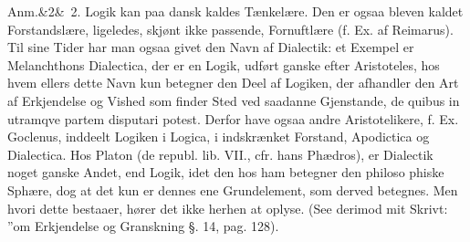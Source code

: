 \documentclass[12pt]{book}
\def\sperr#1{#1}%
\def\textit#1{#1}%
\def\emph#1{#1}%
\newcommand{\sperr}[1]{\textls[180]{#1}}
\newcommand{\anm}[1]{%
  \par\vspace{0.5\baselineskip}%
  \noindent\hspace{\parindent}\sperr{Anm.}\ifx&#1&\else~\textit{#1}.\fi
  \enspace\ignorespaces
}
\newcommand{\opage}[1]{\marginnote{\footnotesize\textit{[#1]}}}
\begin{document}
\anm{2} Logik kan paa dansk kaldes Tænkelære. Den er ogsaa bleven kaldet
Forstandslære, ligeledes, skjønt ikke passende, Fornuftlære (f. Ex. af
Reimarus). Til sine Tider har man ogsaa givet den Navn af \emph{Dialectik}: et
Exempel er Melanchthons \textit{Dialectica}, der er en Logik, udført ganske
efter Aristoteles, hos hvem ellers dette Navn kun betegner den Deel af Logiken,
der afhandler den Art af Erkjendelse og Vished som finder Sted ved saadanne
Gjenstande, \textit{de quibus in utramqve partem disputari potest}. Derfor have
ogsaa andre Aristotelikere, f. Ex. Goclenus, inddeelt Logiken i
\textit{Logica}, i indskrænket Forstand, \textit{Apodictica} og
\textit{Dialectica}. Hos Platon (\textit{de republ. lib. VII.}, cfr. hans
Phædros), er \emph{Dialectik} noget ganske Andet, end Logik, idet den hos ham
betegner den philoso%
\opage{3}phiske Sphære, dog at det kun er dennes ene Grundelement, som derved betegnes.
Men hvori dette bestaaer, hører det ikke herhen at oplyse. (See derimod mit
Skrivt: ''om Erkjendelse og Granskning §. 14, \textit{pag.} 128).
\end{document}
